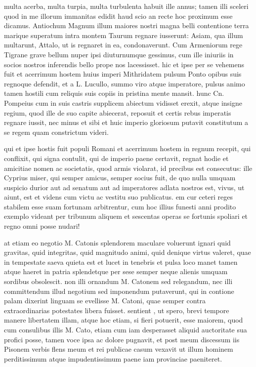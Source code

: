  multa acerba, multa turpia, multa turbulenta habuit ille annus; tamen illi sceleri quod in me illorum immanitas edidit haud scio an recte hoc proximum esse dicamus. Antiochum Magnum illum maiores nostri magna belli contentione terra marique superatum intra montem Taurum regnare iusserunt: Asiam, qua illum multarunt, Attalo, ut is regnaret in ea, condonaverunt. Cum Armeniorum rege Tigrane grave bellum nuper ipsi diuturnumque gessimus, cum ille iniuriis in socios nostros inferendis bello prope nos lacessisset. hic et ipse per se vehemens fuit et acerrimum hostem huius imperi Mithridatem pulsum Ponto opibus suis regnoque defendit, et a L. Lucullo, summo viro atque imperatore, pulsus animo tamen hostili cum reliquis suis copiis in pristina mente mansit. hunc Cn. Pompeius cum in suis castris supplicem abiectum vidisset erexit, atque insigne regium, quod ille de suo capite abiecerat, reposuit et certis rebus imperatis regnare iussit, nec minus et sibi et huic imperio gloriosum putavit constitutum a se regem quam constrictum videri.

 qui et ipse hostis fuit populi Romani et acerrimum hostem in regnum recepit, qui conflixit, qui signa contulit, qui de imperio paene certavit, regnat hodie et amicitiae nomen ac societatis, quod armis violarat, id precibus est consecutus: ille Cyprius miser, qui semper amicus, semper socius fuit, de quo nulla umquam suspicio durior aut ad senatum aut ad imperatores adlata nostros est, vivus, ut aiunt, est et videns cum victu ac vestitu suo publicatus. em cur ceteri reges stabilem esse suam fortunam arbitrentur, cum hoc illius funesti anni prodito exemplo videant per tribunum aliquem et sescentas operas se fortunis spoliari et regno omni posse nudari!

 at etiam eo negotio M. Catonis splendorem maculare voluerunt ignari quid gravitas, quid integritas, quid magnitudo animi, quid denique virtus valeret, quae in tempestate saeva quieta est et lucet in tenebris et pulsa loco manet tamen atque haeret in patria splendetque per sese semper neque alienis umquam sordibus obsolescit. non illi ornandum M. Catonem sed relegandum, nec illi committendum illud negotium sed imponendum putaverunt, qui in contione palam dixerint linguam se evellisse M. Catoni, quae semper contra extraordinarias potestates libera fuisset. sentient , ut spero, brevi tempore manere libertatem illam, atque hoc etiam, si fieri potuerit, esse maiorem, quod cum consulibus illis M. Cato, etiam cum iam desperasset aliquid auctoritate sua profici posse, tamen voce ipsa ac dolore pugnavit, et post meum discessum iis Pisonem verbis flens meum et rei publicae casum vexavit ut illum hominem perditissimum atque impudentissimum paene iam provinciae paeniteret.

